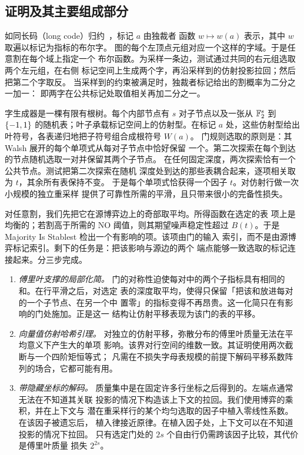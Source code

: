 \subsection*{证明及其主要组成部分}

如同长码（long code）归约~\cite{BGS98,Hastad01}，标记 $a$ 由独裁者
函数 $w\mapsto w(a)$ 表示，其中 $w$ 取遍以标记为指标的布尔字。
图的每个左顶点元组对应一个这样的字域。于是任意割在每个域上指定一个
布尔函数。为采样一条边，测试通过共同的右元组选取两个左元组，在右侧
标记空间上生成两个字，再沿采样到的仿射投影拉回；然后把第二个字取反。
当采样到的约束被满足时，独裁者标记给出的割概率为二分之一加一：
即两字在公共标记处取值相关再加二分之一。

字生成器是一棵有限有根树。每个内部节点有 $s$ 对子节点以及一张从
$\mathbb F_2^s$ 到 $\{-1,1\}$ 的随机表；叶子承载标记空间上的仿射型。在标记 $a$
处，这些仿射型给出叶符号，各表递归地把子符号组合成根符号 $W(a)$。
门规则选取的原则是：其 Walsh 展开的每个单项式从每对子节点中恰好保留
一个。第二次探索在每个到达的节点随机选取一对并保留其两个子节点。
在任何固定深度，两次探索恰有一个公共节点。测试把第二次探索在随机
深度处到达的那些表耦合起来，逐项相关取为 $t$，其余所有表保持不变。
于是每个单项式恰获得一个因子 $t$。对仿射行做一次小规模的独立重采样
提供了可靠性所需的平滑，且只带来很小的完备性损失。

对任意割，我们先把它在源博弈边上的奇部取平均。所得函数在选定的表
项上是均衡的；若割高于所需的 NO 阈值，则其期望噪声稳定性超过
$B(t)$。于是 Majority Is Stablest 检出一个有影响的项。该项由门的输入
索引，而不是由源博弈标记索引。剩下的任务是：把该影响与源边的两个
端点能够一致选取的标记连接起来。分三步完成。

\begin{enumerate}
\item \emph{傅里叶支撑的局部化简。}
门的对称性迫使每对中的两个子指标具有相同的和。在行平滑之后，对选定
表的深度取平均，使得只保留「把该和放进每对的一个子节点、在另一个中
置零」的指标变得不再昂贵。这一化简只在有影响的门处施加。正是这一
结构让仿射平移表现为该门的表的平移。

\item \emph{向量值仿射哈希引理。}
对独立的仿射平移，弥散分布的傅里叶质量无法在平均意义下产生大的单项
影响。该界对行空间的维数一致。其证明使用两次截断与一个四阶矩恒等式；
凡需在不损失字母表规模的前提下解码平移系数阵列的场合，它都可能有用。

\item \emph{带隐藏坐标的解码。}
质量集中是在固定许多行坐标之后得到的。左端点通常无法在不知道其关联
投影的情况下构造该上下文的拉回。我们使用博弈的乘积，并在上下文与
潜在重采样行的某个均匀选取的因子中植入零线性系数。在该因子被遗忘后，
植入律接近原律。在植入因子处，上下文可以在不知道投影的情况下拉回。
只有选定门处的 $2s$ 个自由行仍需跨该因子比较，其代价是傅里叶质量
损失 $2^{2s}$。
\end{enumerate}


